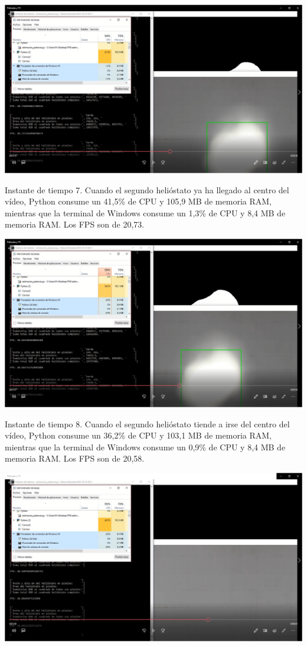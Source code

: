 \documentclass[12pt]{article}
\begin{document}
\includegraphics[width=\textwidth]{CapturasRendimientoSoftware2/Imagen7.png}

Instante de tiempo 7. Cuando el segundo helióstato ya ha llegado al centro del vídeo, Python consume un 41,5\% de CPU y 105,9 MB de memoria RAM, mientras que la terminal de Windows consume un 1,3\% de CPU y 8,4 MB de memoria RAM. Los FPS son de 20,73.


\includegraphics[width=\textwidth]{CapturasRendimientoSoftware2/Imagen8.png}

Instante de tiempo 8. Cuando el segundo helióstato tiende a irse del centro del vídeo, Python consume un 36,2\% de CPU y 103,1 MB de memoria RAM, mientras que la terminal de Windows consume un 0,9\% de CPU y 8,4 MB de memoria RAM. Los FPS son de 20,58.


\includegraphics[width=\textwidth]{CapturasRendimientoSoftware2/Imagen9.png}
\end{document}
